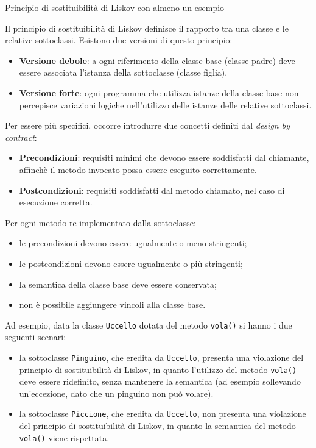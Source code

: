 \begin{problem}{1.15}
Principio di sostituibilità di Liskov con almeno un esempio
\end{problem}
\begin{solution}
Il principio di sostituibilità di Liskov definisce il rapporto tra una classe e le relative sottoclassi.
Esistono due versioni di questo principio:
\begin{itemize}
	\item \textbf{Versione debole}: a ogni riferimento della classe base (classe padre) deve essere associata l'istanza della sottoclasse (classe figlia).
	\item \textbf{Versione forte}: ogni programma che utilizza istanze della classe base non percepisce variazioni logiche nell'utilizzo delle istanze delle relative sottoclassi.
\end{itemize}
Per essere più specifici, occorre introdurre due concetti definiti dal \textit{design by contract}:
\begin{itemize}
	\item \textbf{Precondizioni}: requisiti minimi che devono essere soddisfatti dal chiamante, affinchè il metodo invocato possa essere eseguito correttamente.
	\item \textbf{Postcondizioni}: requisiti soddisfatti dal metodo chiamato, nel caso di esecuzione corretta.
\end{itemize}
Per ogni metodo re-implementato dalla sottoclasse:
\begin{itemize}
	\item le precondizioni devono essere ugualmente o meno stringenti;
	\item le postcondizioni devono essere ugualmente o più stringenti;
	\item la semantica della classe base deve essere conservata;
	\item non è possibile aggiungere vincoli alla classe base.
\end{itemize}
Ad esempio, data la classe \texttt{Uccello} dotata del metodo \texttt{vola()} si hanno i due seguenti scenari:
\begin{itemize}
	\item la sottoclasse \texttt{Pinguino}, che eredita da \texttt{Uccello}, presenta una violazione del principio di sostituibilità di Liskov, in quanto l'utilizzo del metodo \texttt{vola()} deve essere ridefinito, senza mantenere la semantica (ad esempio sollevando un'eccezione, dato che un pinguino non può volare).
	\item la sottoclasse \texttt{Piccione}, che eredita da \texttt{Uccello}, non presenta una violazione del principio di sostituibilità di Liskov, in quanto la semantica del metodo \texttt{vola()} viene rispettata.
\end{itemize}
\end{solution}



